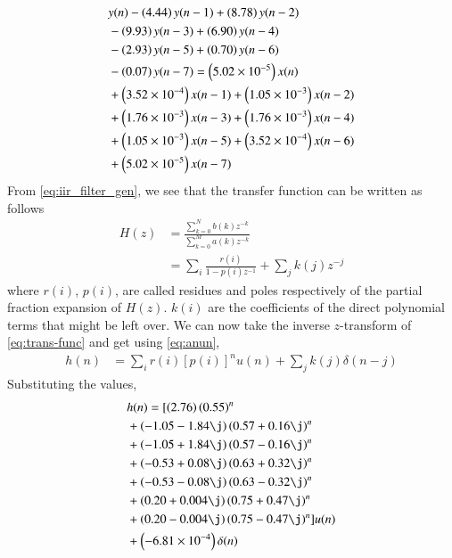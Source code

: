 \documentclass[journal,12pt,twocolumn]{IEEEtran}
\renewcommand\thesection{\arabic{section}}
\begin{document}
\begin{enumerate}[label=\thesection.\arabic*]
\begin{align}
	&y(n) - \left(4.44\right)y(n - 1) + \left(8.78\right)y(n - 2) \nonumber \\
	&- \left(9.93\right)y(n - 3) + \left(6.90\right)y(n - 4) \nonumber \\
	&- \left(2.93\right)y(n - 5) \nonumber + \left(0.70\right)y(n - 6) \nonumber \\
	&- \left(0.07\right)y(n - 7) = \left(5.02 \times 10^{-5}\right)x(n) \nonumber \\
	&+ \left(3.52 \times 10^{-4}\right)x(n - 1) + \left(1.05 \times 10^{-3}\right)x(n - 2) \nonumber \\
	&+ \left(1.76 \times 10^{-3}\right)x(n - 3) + \left(1.76 \times 10^{-3}\right)x(n - 4) \nonumber \\
	&+ \left(1.05 \times 10^{-3}\right)x(n - 5) + \left(3.52 \times 10^{-4}\right)x(n - 6) \nonumber \\
	&+ \left(5.02 \times 10^{-5}\right)x(n - 7)
\end{align}
From \eqref{eq:iir_filter_gen}, we see that the transfer function can be written as follows
\begin{align}
	H(z) &= \frac{\sum_{k = 0}^{N}b(k)z^{-k}}{\sum_{k = 0}^{M}a(k)z^{-k}} \\
	&= \sum_{i}\frac{r(i)}{1 - p(i)z^{-1}} + \sum_{j}k(j)z^{-j}
	\label{eq:trans-func}
\end{align}
where $r(i)$, $p(i)$, are called residues and poles respectively of the partial 
fraction expansion of $H(z)$. $k(i)$ are the coefficients of the direct polynomial 
terms that might be left over. We can now take the inverse $z$-transform of
\eqref{eq:trans-func} and get using \eqref{eq:anun},
\begin{align}
	h(n) &= \sum_{i}r(i)[p(i)]^nu(n) + \sum_{j}k(j)\delta(n - j)
	\label{eq:h-n-expr}
\end{align}
Substituting the values,
\begin{align}
	&h(n) = [\brak{2.76}\brak{0.55}^n \nonumber \\ 
	&+ \brak{-1.05-1.84\j}\brak{0.57+0.16\j}^n \nonumber \\
	&+ \brak{-1.05+1.84\j}\brak{0.57-0.16\j}^n \nonumber \\
	&+ \brak{-0.53+0.08\j}\brak{0.63+0.32\j}^n \nonumber \\
	&+ \brak{-0.53-0.08\j}\brak{0.63-0.32\j}^n \nonumber \\
	&+ \brak{0.20+0.004\j}\brak{0.75+0.47\j}^n \nonumber \\
	&+ \brak{0.20-0.004\j}\brak{0.75-0.47\j}^n]u(n) \nonumber \\
	&+ \brak{-6.81 \times 10^{-4}}\delta(n)
\end{align}

\end{enumerate}
\end{document}
